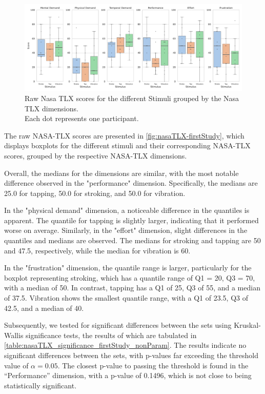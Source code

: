 \begin{figure}
    \centering
    \includegraphics[width=\linewidth]{src/pictures/Study1Data_questionnaire/NasaTLX_study1.pdf}
    \caption{Raw Nasa TLX scores for the different Stimuli grouped by the Nasa TLX dimensions.\\ Each dot represents one participant.}
    \label{fig:nasaTLX-firstStudy}
\end{figure}

The raw NASA-TLX scores are presented in \autoref{fig:nasaTLX-firstStudy}, which displays boxplots for the different stimuli and their corresponding NASA-TLX scores, grouped by the respective NASA-TLX dimensions.

Overall, the medians for the dimensions are similar, with the most notable difference observed in the "performance" dimension. Specifically, the medians are 25.0 for tapping, 50.0 for stroking, and 50.0 for vibration.

In the "physical demand" dimension, a noticeable difference in the quantiles is apparent. The quantile for tapping is slightly larger, indicating that it performed worse on average. Similarly, in the "effort" dimension, slight differences in the quantiles and medians are observed. The medians for stroking and tapping are 50 and 47.5, respectively, while the median for vibration is 60.

In the "frustration" dimension, the quantile range is larger, particularly for the boxplot representing stroking, which has a quantile range of Q1 = 20, Q3 = 70, with a median of 50. In contrast, tapping has a Q1 of 25, Q3 of 55, and a median of 37.5. Vibration shows the smallest quantile range, with a Q1 of 23.5, Q3 of 42.5, and a median of 40.

Subsequently, we tested for significant differences between the sets using Kruskal-Wallis significance tests, the results of which are tabulated in \autoref{table:nasaTLX_significance_firstStudy_nonParam}.
The results indicate no significant differences between the sets, with p-values far exceeding the threshold value of $\alpha=0.05$.
The closest p-value to passing the threshold is found in the \enquote{Performance} dimension, with a p-value of 0.1496, which is not close to being statistically significant.

